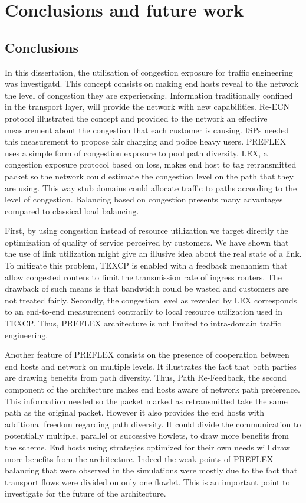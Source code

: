 \chapter{Conclusions and future work}
\label{chap:conclusion}
\section{Conclusions}

In this dissertation, the utilisation of congestion exposure for traffic engineering was investigatd. This concept consists on making end hosts reveal to the network the level of congestion they are experiencing. Information traditionally confined in the transport layer, will provide the network with new capabilities. Re-ECN protocol illustrated the concept and provided  to the network an effective measurement about the congestion that each customer is causing. ISPs needed this measurement to propose fair charging and police heavy users. PREFLEX uses a simple form of congestion exposure to pool path diversity. LEX, a congestion exposure protocol based on loss, makes end host to tag retransmitted packet so the network could estimate the congestion level on the path that they are using. This way stub domains could allocate traffic to paths according to the level of congestion. Balancing based on congestion presents many advantages compared to classical load balancing. 

First, by using congestion instead of resource utilization we target directly the optimization of quality of service perceived by customers. We have shown that the use of link utilization might give an illusive idea about the real state of a link.  To mitigate this problem, TEXCP is enabled with a feedback mechanism that allow congested routers to limit the transmission rate of  ingress routers. The drawback of such means is that bandwidth could be wasted and customers are not treated fairly.  Secondly, the congestion level as revealed by LEX corresponds to an end-to-end measurement contrarily to local resource utilization used in TEXCP. Thus, PREFLEX architecture is not limited to intra-domain traffic engineering. 

Another feature of PREFLEX consists on the presence of cooperation between end hosts and network on multiple levels. It illustrates the fact that both parties are drawing benefits from path diversity. Thus, Path Re-Feedback, the second component of the architecture makes end hosts aware of network path preference. This information needed so the packet marked as retransmitted take the same path as the original packet. However it also provides the end hosts with additional freedom regarding path diversity. It could divide the communication to potentially multiple, parallel or successive flowlets, to draw more benefits from the scheme. End hosts using strategies optimized for their own needs will draw more benefits from the architecture. Indeed the weak points of PREFLEX balancing that were observed in the simulations were mostly due to the fact that transport flows were divided on only one flowlet. This is an important point to investigate for the future of the architecture.
 

